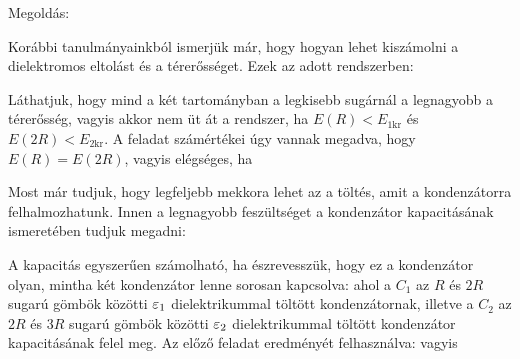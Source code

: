 
\ifdefined\megoldas

 Megoldás: 
 

 Korábbi tanulmányainkból ismerjük már, hogy hogyan lehet kiszámolni a dielektromos eltolást és a térerősséget. Ezek az adott rendszerben:

 Láthatjuk, hogy mind a két tartományban a legkisebb sugárnál a legnagyobb a térerősség, vagyis akkor nem üt át a rendszer, ha $E(R)<E_\text{1kr}$ és $E(2R)<E_\text{2kr}$. A feladat számértékei úgy vannak megadva, hogy $E(R)=E(2R)$, vagyis elégséges, ha 

 Most már tudjuk, hogy legfeljebb mekkora lehet az a töltés, amit a kondenzátorra felhalmozhatunk. Innen a legnagyobb feszültséget a kondenzátor kapacitásának ismeretében tudjuk megadni:

 A kapacitás egyszerűen számolható, ha észrevesszük, hogy ez a kondenzátor olyan, mintha két kondenzátor lenne sorosan kapcsolva:
 ahol a $C_1$ az $R$ és $2R$ sugarú gömbök közötti $\varepsilon_1$ dielektrikummal töltött kondenzátornak, illetve a $C_2$ az $2R$ és $3R$ sugarú gömbök közötti $\varepsilon_2$ dielektrikummal töltött kondenzátor kapacitásának felel meg. Az előző feladat eredményét felhasználva:
 vagyis

\fi